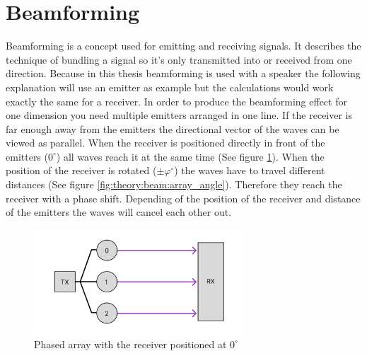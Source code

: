 \section{Beamforming}\label{sec:theory:beam}


Beamforming is a concept used for emitting and receiving signals. It describes the technique of bundling a signal so it's only transmitted into or received from one direction. Because in this thesis beamforming is used with a speaker the following explanation will use an emitter as example but the calculations would work exactly the same for a receiver.\cite{van_veen_beamforming_1988}\p
%
In order to produce the beamforming effect for one dimension you need multiple emitters arranged in one line.
If the receiver is far enough away from the emitters the directional vector of the waves can be viewed as parallel. When the receiver is positioned directly in front of the emitters (\(0^\circ\)) all waves reach it at the same time (See figure \ref{fig:theory:beam:array_straight}).
When the position of the receiver is rotated (\(\pm \varphi^\circ\)) the waves have to travel different distances (See figure \ref{fig:theory:beam:array_angle}). Therefore they reach the receiver with a phase shift. Depending of the position of the receiver and distance of the emitters the waves will cancel each other out.
%
\begin{figure}
  \centering
  \includegraphics[width=0.7\textwidth]{src/assets/pictures/theory/straight_array.png}
  \caption{Phased array with the receiver positioned at $0^\circ$}\label{fig:theory:beam:array_straight}
\end{figure}
